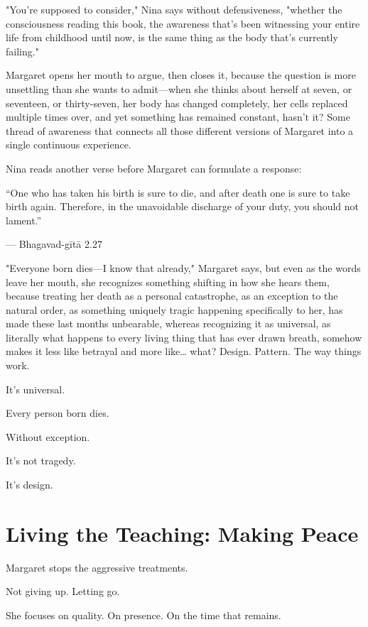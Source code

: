 \documentclass[11pt,twoside]{book}
\begin{document}
"You're supposed to consider," Nina says without defensiveness, "whether the consciousness reading this book, the awareness that's been witnessing your entire life from childhood until now, is the same thing as the body that's currently failing."

Margaret opens her mouth to argue, then closes it, because the question is more unsettling than she wants to admit—when she thinks about herself at seven, or seventeen, or thirty-seven, her body has changed completely, her cells replaced multiple times over, and yet something has remained constant, hasn't it? Some thread of awareness that connects all those different versions of Margaret into a single continuous experience.

Nina reads another verse before Margaret can formulate a response:

\begin{pullquote}
``One who has taken his birth is sure to die, and after death one is sure to take birth again. Therefore, in the unavoidable discharge of your duty, you should not lament.''

--- Bhagavad-gītā 2.27
\end{pullquote}

"Everyone born dies—I know that already," Margaret says, but even as the words leave her mouth, she recognizes something shifting in how she hears them, because treating her death as a personal catastrophe, as an exception to the natural order, as something uniquely tragic happening specifically to her, has made these last months unbearable, whereas recognizing it as universal, as literally what happens to every living thing that has ever drawn breath, somehow makes it less like betrayal and more like\ldots{} what? Design. Pattern. The way things work.

It's universal.

Every person born dies.

Without exception.

It's not tragedy.

It's design.

\section*{Living the Teaching: Making Peace}

Margaret stops the aggressive treatments.

Not giving up. Letting go.

She focuses on quality. On presence. On the time that remains.
\end{document}
